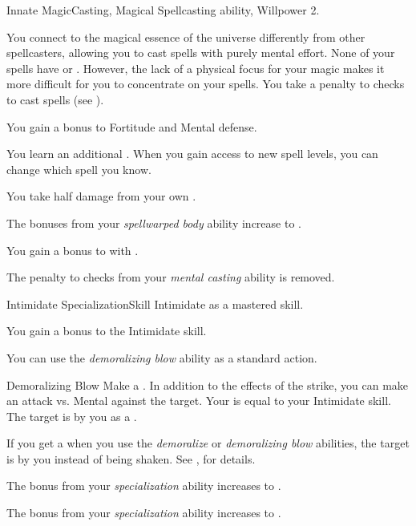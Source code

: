     \begin{feat}{Innate Magic}{Casting, Magical}
        \featpre Spellcasting ability, Willpower 2.

         You connect to the magical essence of the universe differently from other spellcasters, allowing you to cast spells with purely mental effort.
        None of your spells have  or .
        However, the lack of a physical focus for your magic makes it more difficult for you to concentrate on your spells.
        You take a  penalty to  checks to cast spells (see ).

         You gain a  bonus to Fortitude and Mental defense.

         You learn an additional .
        When you gain access to new spell levels, you can change which spell you know.

         You take half damage from your own .

         The bonuses from your \textit{spellwarped body} ability increase to .

         You gain a  bonus to  with .

         The penalty to  checks from your \textit{mental casting} ability is removed.
    \end{feat}

    \begin{feat}{Intimidate Specialization}{Skill}
        \featpre Intimidate as a mastered skill.

         You gain a  bonus to the Intimidate skill.

         You can use the \textit{demoralizing blow} ability as a standard action.
        \begin{apability}{Demoralizing Blow}
            Make a .
            In addition to the effects of the strike, you can make an attack vs. Mental against the target.
            Your  is equal to your Intimidate skill.
            \hit The target is \shaken by you as a .
        \end{apability}

         If you get a  when you use the \textit{demoralize} or \textit{demoralizing blow} abilities, the target is \frightened by you instead of being shaken.
        See , for details.

         The bonus from your \textit{specialization} ability increases to .

         The bonus from your \textit{specialization} ability increases to .
    \end{feat}

